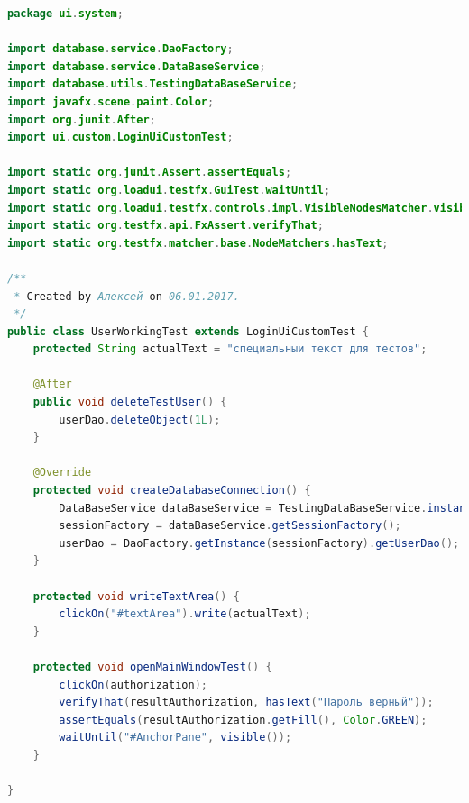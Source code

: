 \documentclass[a4paper,12pt]{article}
\begin{document}
\begin{lstlisting}[language=java, caption=код модуля UserWorkingTest.java]
package ui.system;

import database.service.DaoFactory;
import database.service.DataBaseService;
import database.utils.TestingDataBaseService;
import javafx.scene.paint.Color;
import org.junit.After;
import ui.custom.LoginUiCustomTest;

import static org.junit.Assert.assertEquals;
import static org.loadui.testfx.GuiTest.waitUntil;
import static org.loadui.testfx.controls.impl.VisibleNodesMatcher.visible;
import static org.testfx.api.FxAssert.verifyThat;
import static org.testfx.matcher.base.NodeMatchers.hasText;

/**
 * Created by Алексей on 06.01.2017.
 */
public class UserWorkingTest extends LoginUiCustomTest {
    protected String actualText = "специальныи текст для тестов";

    @After
    public void deleteTestUser() {
        userDao.deleteObject(1L);
    }

    @Override
    protected void createDatabaseConnection() {
        DataBaseService dataBaseService = TestingDataBaseService.instanceDataBaseService();
        sessionFactory = dataBaseService.getSessionFactory();
        userDao = DaoFactory.getInstance(sessionFactory).getUserDao();
    }

    protected void writeTextArea() {
        clickOn("#textArea").write(actualText);
    }

    protected void openMainWindowTest() {
        clickOn(authorization);
        verifyThat(resultAuthorization, hasText("Пароль верный"));
        assertEquals(resultAuthorization.getFill(), Color.GREEN);
        waitUntil("#AnchorPane", visible());
    }

}
\end{lstlisting}
\end{document}
